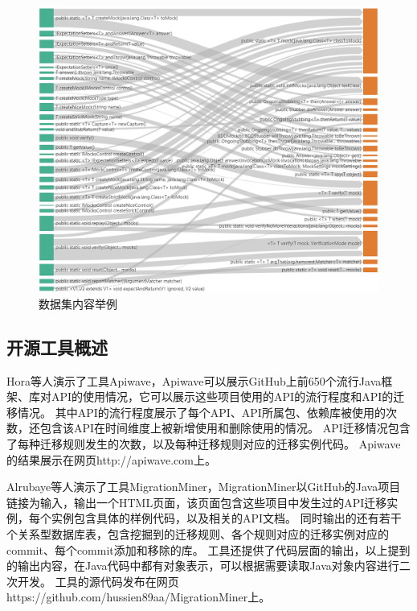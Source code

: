 \documentclass[UTF8]{ctexart}
\begin{document}
\begin{figure}
\centering
\includegraphics[width=\textwidth]{fig/alrubaye_dataset.png}
\caption{数据集\cite{API2018}内容举例}
\label{fig:api-2018} 
\end{figure}

\subsection{开源工具概述}



Hora\cite{2015ICSME-Hora-Apiwave}等人演示了工具Apiwave，Apiwave可以展示GitHub上前650个流行Java框架、库对API的使用情况，它可以展示这些项目使用的API的流行程度和API的迁移情况。
其中API的流行程度展示了每个API、API所属包、依赖库被使用的次数，还包含该API在时间维度上被新增使用和删除使用的情况。
API迁移情况包含了每种迁移规则发生的次数，以及每种迁移规则对应的迁移实例代码。
Apiwave的结果展示在网页http://apiwave.com上。

Alrubaye\cite{2019ICSME-Alrubaye-MigrationMiner}等人演示了工具MigrationMiner，MigrationMiner以GitHub的Java项目链接为输入，输出一个HTML页面，该页面包含这些项目中发生过的API迁移实例，每个实例包含具体的样例代码，以及相关的API文档。
同时输出的还有若干个关系型数据库表，包含挖掘到的迁移规则、各个规则对应的迁移实例对应的commit、每个commit添加和移除的库。
工具还提供了代码层面的输出，以上提到的输出内容，在Java代码中都有对象表示，可以根据需要读取Java对象内容进行二次开发。
工具的源代码发布在网页https://github.com/hussien89aa/MigrationMiner上。
\end{document}
